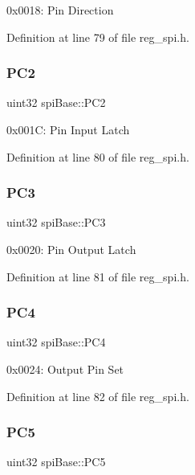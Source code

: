 0x0018\+: Pin Direction 

Definition at line 79 of file reg\+\_\+spi.\+h.

\mbox{\label{structspiBase_ae32622aa0d458542f4127b0ee49f82d3}} 
\subsubsection{\texorpdfstring{P\+C2}{PC2}}
{\footnotesize\ttfamily uint32 spi\+Base\+::\+P\+C2}

0x001C\+: Pin Input Latch 

Definition at line 80 of file reg\+\_\+spi.\+h.

\mbox{\label{structspiBase_ab3340a489713a192e2727105e62f77a7}} 
\subsubsection{\texorpdfstring{P\+C3}{PC3}}
{\footnotesize\ttfamily uint32 spi\+Base\+::\+P\+C3}

0x0020\+: Pin Output Latch 

Definition at line 81 of file reg\+\_\+spi.\+h.

\mbox{\label{structspiBase_af4789d94b534fcc8a3fafaf0a67de60c}} 
\subsubsection{\texorpdfstring{P\+C4}{PC4}}
{\footnotesize\ttfamily uint32 spi\+Base\+::\+P\+C4}

0x0024\+: Output Pin Set 

Definition at line 82 of file reg\+\_\+spi.\+h.

\mbox{\label{structspiBase_a546bed69939f177f83f0d43a1720a12a}} 
\subsubsection{\texorpdfstring{P\+C5}{PC5}}
{\footnotesize\ttfamily uint32 spi\+Base\+::\+P\+C5}


